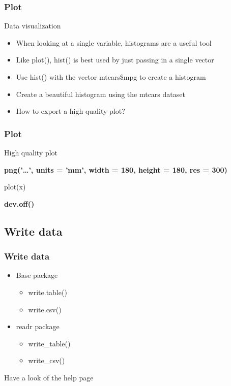 \documentclass{beamer}
\begin{document}
\begin{frame}[fragile]
	\frametitle{Plot}
	\centering \Large Data visualization
	\begin{itemize}
		\small
		\item When looking at a single variable, histograms are a useful tool
		\item Like plot(), hist() is best used by just passing in a single vector
		\item Use hist() with the vector mtcars\$mpg to create a histogram
	\pause
		\item Create a beautiful histogram using the mtcars dataset 
	\pause
		\item How to export a high quality plot?
	\end{itemize}
\end{frame}

\begin{frame}[fragile]
	\frametitle{Plot}
	\centering \Large High quality plot
	\vspace{30pt}
	\normalsize
	\begin{flushleft}
		\textbf{png('\ldots', units = 'mm', width = 180, height = 180, res = 300)}

	plot(x)

	\textbf{dev.off()}
	\end{flushleft}
\end{frame}


\subsection{Write data}
\begin{frame}[fragile]
	\frametitle{Write data}
	\centering \Large
	\begin{itemize}
		\small
		\item Base package
			\begin{itemize}
				\item write.table()
				\item write.csv()
			\end{itemize}
		\item readr package
			\begin{itemize}
				\item write\_table()
				\item write\_csv()
			\end{itemize}
	\end{itemize}
	\vspace{20pt}
	\pause
	\begin{center} \Large Have a look of the help page \end{center}
\end{frame}
\end{document}
